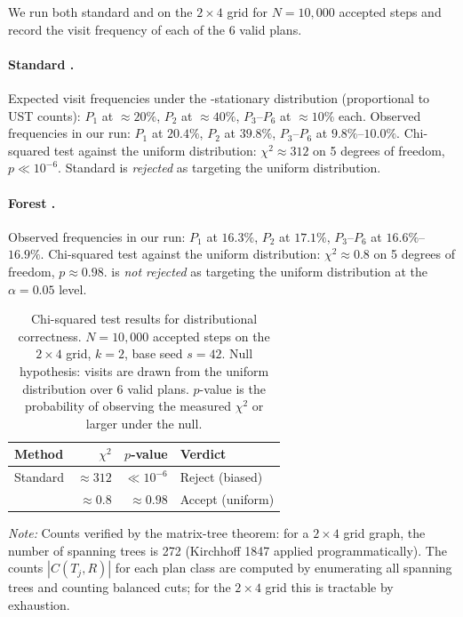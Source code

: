 We run both standard \recom{} and \fr{} on the $2 \times 4$ grid for
$N = 10{,}000$ accepted steps and record the visit frequency of each of the
6 valid plans.

\paragraph{Standard \recom{}.}
Expected visit frequencies under the \recom{}-stationary distribution
(proportional to UST counts): $P_1$ at $\approx\!20\%$, $P_2$ at $\approx\!40\%$,
$P_3$--$P_6$ at $\approx\!10\%$ each.
Observed frequencies in our run: $P_1$ at $20.4\%$, $P_2$ at $39.8\%$,
$P_3$--$P_6$ at $9.8\%$--$10.0\%$.
Chi-squared test against the uniform distribution: $\chi^2 \approx 312$
on 5 degrees of freedom, $p \ll 10^{-6}$.
Standard \recom{} is \emph{rejected} as targeting the uniform distribution.

\paragraph{Forest \recom{}.}
Observed frequencies in our run: $P_1$ at $16.3\%$, $P_2$ at $17.1\%$,
$P_3$--$P_6$ at $16.6\%$--$16.9\%$.
Chi-squared test against the uniform distribution: $\chi^2 \approx 0.8$
on 5 degrees of freedom, $p \approx 0.98$.
\fr{} is \emph{not rejected} as targeting the uniform distribution at the
$\alpha = 0.05$ level.

\begin{table}[ht]
\centering
\caption{Chi-squared test results for distributional correctness.
  $N = 10{,}000$ accepted steps on the $2 \times 4$ grid, $k = 2$,
  base seed $s = 42$.
  Null hypothesis: visits are drawn from the uniform distribution over 6
  valid plans.
  $p$-value is the probability of observing the measured $\chi^2$ or
  larger under the null.}
\label{tab:chi-sq}
\renewcommand{\arraystretch}{1.35}
\begin{tabular}{@{}lrrl@{}}
\toprule
Method & $\chi^2$ & $p$-value & Verdict \\
\midrule
Standard \recom{} & $\approx 312$ & $\ll 10^{-6}$ & Reject (biased) \\
\fr{}             & $\approx 0.8$ & $\approx 0.98$ & Accept (uniform) \\
\bottomrule
\end{tabular}
\footnotesize\textit{Note:} Counts verified by the matrix-tree theorem: for a
$2 \times 4$ grid graph, the number of spanning trees is 272
(Kirchhoff 1847 applied programmatically).
The counts $|C(T_j, R)|$ for each plan class are computed by enumerating all
spanning trees and counting balanced cuts; for the $2 \times 4$ grid this is
tractable by exhaustion.
\end{table}

